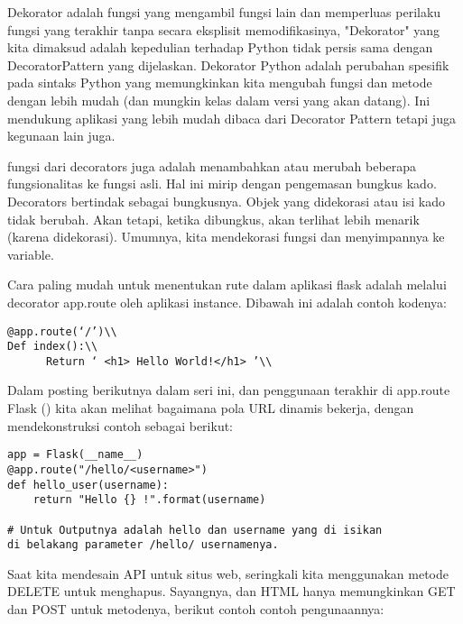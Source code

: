 \documentclass[12pt,a4paper]{article}
\begin{document}
Dekorator adalah fungsi yang mengambil fungsi lain dan memperluas perilaku fungsi yang terakhir tanpa secara eksplisit memodifikasinya, "Dekorator" yang kita dimaksud adalah kepedulian terhadap Python tidak persis sama dengan DecoratorPattern yang dijelaskan. Dekorator Python adalah perubahan spesifik pada sintaks Python yang memungkinkan kita mengubah fungsi dan metode dengan lebih mudah (dan mungkin kelas dalam versi yang akan datang). Ini mendukung aplikasi yang lebih mudah dibaca dari Decorator Pattern tetapi juga kegunaan lain juga.

fungsi dari decorators juga adalah menambahkan atau merubah beberapa fungsionalitas ke fungsi asli. Hal ini mirip dengan pengemasan bungkus kado. Decorators bertindak sebagai bungkusnya. Objek yang didekorasi atau isi kado tidak berubah. Akan tetapi, ketika dibungkus, akan terlihat lebih menarik (karena didekorasi). Umumnya, kita mendekorasi fungsi dan menyimpannya ke variable.

Cara paling mudah untuk menentukan rute dalam aplikasi flask adalah melalui decorator app.route oleh aplikasi instance. Dibawah ini adalah contoh kodenya:\\
\begin{verbatim}
@app.route(‘/’)\\
Def index():\\
      Return ‘ <h1> Hello World!</h1> ’\\
\end{verbatim}

Dalam posting berikutnya dalam seri ini, dan penggunaan terakhir di app.route Flask () kita akan melihat bagaimana pola URL dinamis bekerja, dengan mendekonstruksi contoh sebagai berikut:

\begin{verbatim}
app = Flask(__name__)
@app.route("/hello/<username>")
def hello_user(username):
    return "Hello {} !".format(username)
    
# Untuk Outputnya adalah hello dan username yang di isikan 
di belakang parameter /hello/ usernamenya.
\end{verbatim}

Saat kita mendesain API untuk situs web, seringkali kita menggunakan metode DELETE untuk menghapus. Sayangnya, dan HTML hanya memungkinkan GET dan POST untuk metodenya, berikut contoh contoh pengunaannya:
\end{document}

